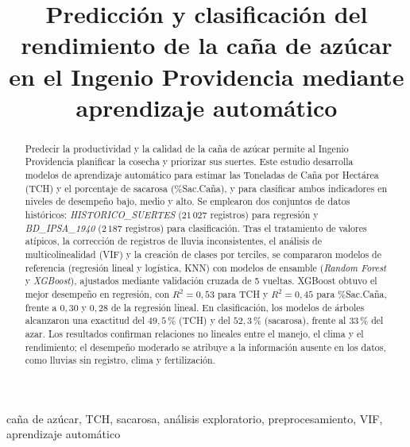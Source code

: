 \documentclass[conference]{IEEEtran}
\begin{document}
\title{Predicción y clasificación del rendimiento de la caña de azúcar en el Ingenio Providencia mediante aprendizaje automático}

\author{
}

\maketitle

\begin{abstract}
Predecir la productividad y la calidad de la caña de azúcar permite al Ingenio Providencia planificar la cosecha y priorizar sus suertes. Este estudio desarrolla modelos de aprendizaje automático para estimar las Toneladas de Caña por Hectárea (TCH) y el porcentaje de sacarosa (\%Sac.Caña), y para clasificar ambos indicadores en niveles de desempeño bajo, medio y alto. Se emplearon dos conjuntos de datos históricos: \textit{HISTORICO\_SUERTES} ($21\,027$ registros) para regresión y \textit{BD\_IPSA\_1940} ($2\,187$ registros) para clasificación. Tras el tratamiento de valores atípicos, la corrección de registros de lluvia inconsistentes, el análisis de multicolinealidad (VIF) y la creación de clases por terciles, se compararon modelos de referencia (regresión lineal y logística, KNN) con modelos de ensamble (\textit{Random Forest} y \textit{XGBoost}), ajustados mediante validación cruzada de 5 vueltas. XGBoost obtuvo el mejor desempeño en regresión, con $R^2 = 0{,}53$ para TCH y $R^2 = 0{,}45$ para \%Sac.Caña, frente a $0{,}30$ y $0{,}28$ de la regresión lineal. En clasificación, los modelos de árboles alcanzaron una exactitud del $49{,}5\,\%$ (TCH) y del $52{,}3\,\%$ (sacarosa), frente al $33\,\%$ del azar. Los resultados confirman relaciones no lineales entre el manejo, el clima y el rendimiento; el desempeño moderado se atribuye a la información ausente en los datos, como lluvias sin registro, clima y fertilización.
\end{abstract}

\begin{IEEEkeywords}
caña de azúcar, TCH, sacarosa, análisis exploratorio, preprocesamiento, VIF, aprendizaje automático
\end{IEEEkeywords}
\end{document}
